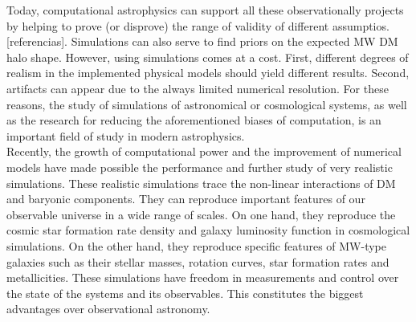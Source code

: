 \documentclass[12pt]{article}
\begin{document}
Today, computational astrophysics can support all these observationally projects by helping to prove (or disprove) the range of validity of different assumptios. [referencias].
Simulations can also serve to find priors on the expected MW DM halo shape.
However, using simulations comes at a cost.
First, different degrees of realism in the implemented physical models should yield different results.
Second, artifacts can appear due to the always limited numerical resolution. 
For these reasons, the study of simulations of astronomical or cosmological systems, as well as the research for reducing the aforementioned biases of computation, is an important field of study in modern astrophysics.\\

Recently, the growth of computational power and the improvement of numerical models have made possible the performance and further study of very realistic simulations.
These realistic simulations trace the non-linear interactions of DM and baryonic components. 
They can reproduce important features of our observable universe in a wide range of scales.
On one hand, they reproduce the cosmic star formation rate density and galaxy luminosity function in cosmological simulations.
On the other hand, they reproduce specific features of MW-type galaxies such as their stellar masses, rotation curves, star formation rates and metallicities. 
These simulations have freedom in measurements and control over the state of the systems and its observables.
This constitutes the biggest advantages over observational astronomy.\\
\end{document}
